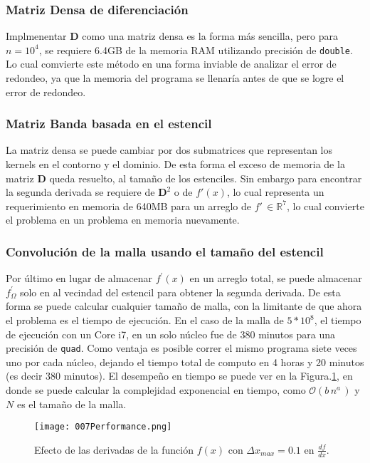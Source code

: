\documentclass[9pt,technote,twoside,letterpaper,onecolumn]{IEEEtran}
\begin{document}
\begin{multicols}{2}
\subsubsection{Matriz Densa de diferenciación}
\label{sec:imp_matrix}
Implmenentar $\mathbf{D}$ como una matriz densa es la forma más sencilla, pero para $n=10^4$, se requiere 6.4GB de la memoria RAM utilizando precisión de \verb.double.. Lo cual comvierte este método en una forma inviable de analizar el error de redondeo, ya que la memoria del programa se llenaría antes de que se logre el error de redondeo. 
\subsubsection{Matriz Banda basada en el estencil}
\label{sec:imp_matrix_band}
La matriz densa se puede cambiar por dos submatrices que representan los kernels en el contorno y el dominio. De esta forma el exceso de memoria de la matriz $\mathbf{D}$ queda resuelto, al tamaño de los estenciles. Sin embargo para encontrar la segunda derivada se requiere de $\mathbf{D}^2$ o de $f'(x)$, lo cual representa un requerimiento en memoria de 640MB para un arreglo de $f'\,\in\mathbb{R}^7$, lo cual convierte el problema en un problema en memoria nuevamente.
\subsubsection{Convolución de la malla usando el tamaño del estencil}
\label{sec:imp_conv}
Por último en lugar de almacenar $f^{'}(x)$ en un arreglo total, se puede almacenar $f^{'}_{\Omega}$ solo en al vecindad del estencil para obtener la segunda derivada. De esta forma se puede calcular cualquier tamaño de malla, con la limitante de que ahora el problema es el tiempo de ejecución. En el caso de la malla de $5*10^8$, el tiempo de ejecución con un Core i7, en un solo núcleo fue de 380 minutos para una precisión de \verb.quad.. Como ventaja es posible correr el mismo programa siete veces uno por cada núcleo, dejando el tiempo total de computo en 4 horas y 20 minutos (es decir 380 minutos). El desempeño en tiempo se puede ver en la Figura.\ref{fig:performance}, en donde se puede calcular la complejidad exponencial en tiempo, como $\mathcal{O}(b\,n^a\,)$ y $N$ es el tamaño de la malla.

\begin{figure}[H]
  \texttt{[image: 007Performance.png]}
  \caption{Efecto de las derivadas de la función $f(x)$ con $\Delta x_{max}=0.1$ en $\frac{df}{dx}$.}
  \label{fig:performance}
  \centering
\end{figure}


\end{multicols}
\end{document}
